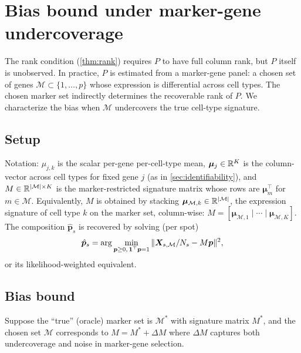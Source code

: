 \section{Bias bound under marker-gene undercoverage}
\label{sec:methodology}

The rank condition (\cref{thm:rank}) requires $P$ to have full column
rank, but $P$ itself is unobserved. In practice, $P$ is estimated
from a marker-gene panel: a chosen set of genes $\mathcal{M} \subset
\{1,\ldots,p\}$ whose expression is differential across cell types.
The chosen marker set indirectly determines the recoverable rank of
$P$. We characterize the bias when $\mathcal{M}$ undercovers the
true cell-type signature.

\subsection{Setup}

Notation: $\mu_{j,k}$ is the scalar per-gene per-cell-type mean,
$\bm{\mu}_j \in \mathbb{R}^K$ is the column-vector across cell types for
fixed gene $j$ (as in \cref{sec:identifiability}), and $M \in
\mathbb{R}^{|\mathcal{M}| \times K}$ is the marker-restricted signature
matrix whose rows are $\bm{\mu}_m^\top$ for $m \in \mathcal{M}$.
Equivalently, $M$ is obtained by stacking
$\bm{\mu}_{\mathcal{M}, k} \in \mathbb{R}^{|\mathcal{M}|}$, the expression
signature of cell type $k$ on the marker set, column-wise:
$M = [\bm{\mu}_{\mathcal{M},1} \mid \cdots \mid
\bm{\mu}_{\mathcal{M},K}]$. The composition $\hat{\bm{p}}_s$ is recovered by
solving (per spot)
\begin{equation}
  \hat{\bm{p}}_s = \arg\min_{\bm{p} \geq 0,\, \mathbf{1}^\top \bm{p} = 1}
  \|\bm{X}_{s,\mathcal{M}}/N_s - M \bm{p}\|^2,
  \label{eq:meth-fit}
\end{equation}
or its likelihood-weighted equivalent.

\subsection{Bias bound}

Suppose the ``true'' (oracle) marker set is $\mathcal{M}^*$ with
signature matrix $M^*$, and the chosen set $\mathcal{M}$ corresponds
to $M = M^* + \Delta M$ where $\Delta M$ captures both
undercoverage and noise in marker-gene selection.

